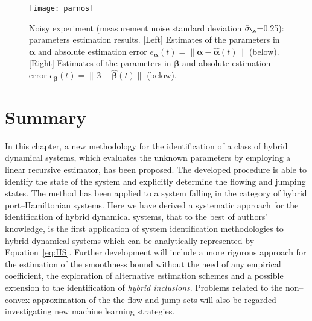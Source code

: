 %
%
\begin{figure}[t!]
	\centering
	\texttt{[image: parnos]}
	\caption[Noisy experiment: parameters estimation results.]{Noisy experiment (measurement noise standard deviation $\tilde{\sigma}_{\x}$=0.25): parameters estimation results. [Left] Estimates of the parameters in $\bm{\alpha}$ and absolute estimation error $e_{\bm{\alpha}}(t)=\|\bm{\alpha}-\hat{\bm{\alpha}}(t)\|$ (below). [Right] Estimates of the parameters in $\bm{\beta}$ and absolute estimation error $e_{\bm{\beta}}(t)=\|\bm{\beta}-\hat{\bm{\beta}}(t)\|$ (below).}
	\label{fig:parnos}
\end{figure}

\clearpage
\section{Summary}\label{conc}
In this chapter, a new methodology for the identification of a class of hybrid dynamical systems, which evaluates the unknown parameters by employing a linear recursive estimator, has been proposed. The developed procedure is able to identify the state of the system and explicitly determine the flowing and jumping states. The method has been applied to a system falling in the category of hybrid port--Hamiltonian systems.
Here we have derived a systematic approach for the identification of hybrid dynamical systems, that to the best of authors' knowledge, is the first application of system identification methodologies to hybrid dynamical systems which can be analytically represented by Equation~\ref{eq:HS}.
Further development will include a more rigorous approach for the estimation of the smoothness bound without the need of any empirical coefficient, the exploration of alternative estimation schemes and a possible extension to the identification of \textit{hybrid inclusions}. Problems related to the non--convex approximation of the the flow and jump sets will also be regarded investigating new machine learning strategies.
%
